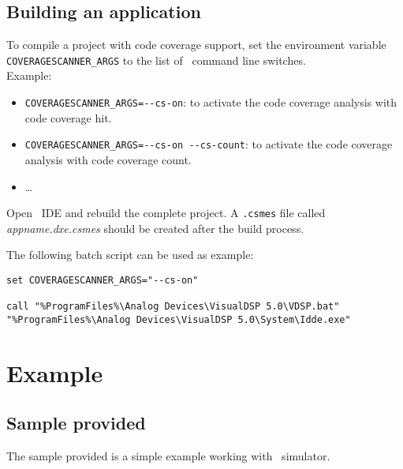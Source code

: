 \subsection{Building an application}

To compile a project with code coverage support, set the environment variable \verb$COVERAGESCANNER_ARGS$
to the list of \CoverageScanner\ command line switches. \\

Example:
\begin{itemize}
\item \verb$COVERAGESCANNER_ARGS=--cs-on$: to activate the code coverage analysis with code coverage hit.
\item \verb$COVERAGESCANNER_ARGS=--cs-on --cs-count$: to activate the code coverage analysis with code coverage count.
\item \ldots
\end{itemize}

Open \VisualDSP\ IDE and rebuild the complete project. A \verb$.csmes$ file called {\itshape appname.dxe.csmes} should be created after the build process.

\bigskip\par
The following batch script can be used as example:\\
\begin{verbatim}
set COVERAGESCANNER_ARGS="--cs-on"

call "%ProgramFiles%\Analog Devices\VisualDSP 5.0\VDSP.bat"
"%ProgramFiles%\Analog Devices\VisualDSP 5.0\System\Idde.exe"
\end{verbatim}

\section{Example}

\subsection{Sample provided}
The sample provided is a simple example working with \VisualDSP\ simulator. \\

